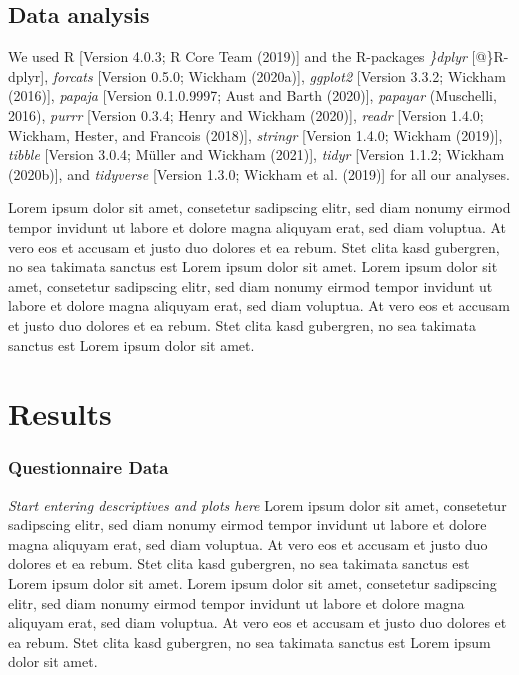 \documentclass[
  english,
  man,floatsintext]{apa6}
\begin{document}
\hypertarget{data-analysis}{%
\subsection{Data analysis}\label{data-analysis}}

We used R {[}Version 4.0.3; R Core Team (2019){]} and the R-packages \emph{\}dplyr} {[}@\}R-dplyr{]}, \emph{forcats} {[}Version 0.5.0; Wickham (2020a){]}, \emph{ggplot2} {[}Version 3.3.2; Wickham (2016){]}, \emph{papaja} {[}Version 0.1.0.9997; Aust and Barth (2020){]}, \emph{papayar} (Muschelli, 2016), \emph{purrr} {[}Version 0.3.4; Henry and Wickham (2020){]}, \emph{readr} {[}Version 1.4.0; Wickham, Hester, and Francois (2018){]}, \emph{stringr} {[}Version 1.4.0; Wickham (2019){]}, \emph{tibble} {[}Version 3.0.4; Müller and Wickham (2021){]}, \emph{tidyr} {[}Version 1.1.2; Wickham (2020b){]}, and \emph{tidyverse} {[}Version 1.3.0; Wickham et al. (2019){]} for all our analyses.

Lorem ipsum dolor sit amet, consetetur sadipscing elitr, sed diam nonumy eirmod tempor invidunt ut labore et dolore magna aliquyam erat, sed diam voluptua. At vero eos et accusam et justo duo dolores et ea rebum. Stet clita kasd gubergren, no sea takimata sanctus est Lorem ipsum dolor sit amet. Lorem ipsum dolor sit amet, consetetur sadipscing elitr, sed diam nonumy eirmod tempor invidunt ut labore et dolore magna aliquyam erat, sed diam voluptua. At vero eos et accusam et justo duo dolores et ea rebum. Stet clita kasd gubergren, no sea takimata sanctus est Lorem ipsum dolor sit amet.

\hypertarget{results}{%
\section{Results}\label{results}}

\hypertarget{questionnaire-data-1}{%
\subsubsection{Questionnaire Data}\label{questionnaire-data-1}}

\emph{Start entering descriptives and plots here} Lorem ipsum dolor sit amet, consetetur sadipscing elitr, sed diam nonumy eirmod tempor invidunt ut labore et dolore magna aliquyam erat, sed diam voluptua. At vero eos et accusam et justo duo dolores et ea rebum. Stet clita kasd gubergren, no sea takimata sanctus est Lorem ipsum dolor sit amet. Lorem ipsum dolor sit amet, consetetur sadipscing elitr, sed diam nonumy eirmod tempor invidunt ut labore et dolore magna aliquyam erat, sed diam voluptua. At vero eos et accusam et justo duo dolores et ea rebum. Stet clita kasd gubergren, no sea takimata sanctus est Lorem ipsum dolor sit amet.
\end{document}
